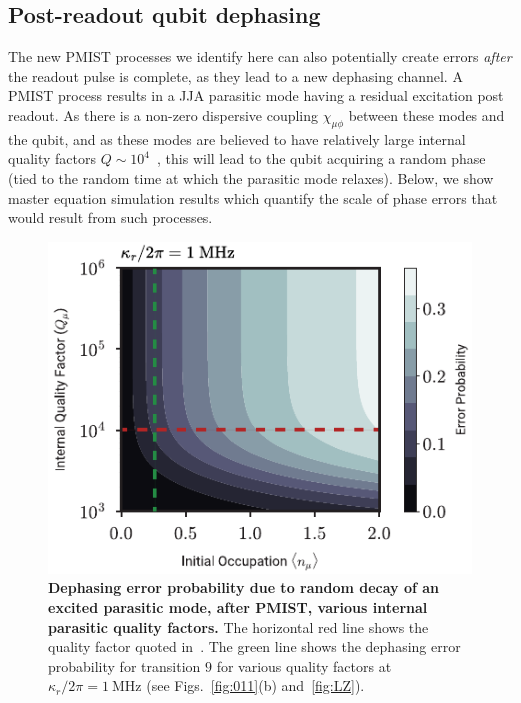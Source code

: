 \documentclass[%
reprint,
superscriptaddress,
 amsmath,amssymb,
 aps,
 prx,
longbibliography,
floatfix,
]{revtex4-2}
\begin{document}
\subsection{Post-readout qubit dephasing}\label{sec:dephasing}

The new PMIST processes we identify here can also potentially create errors \textit{after} the readout pulse is complete, as they lead to a new dephasing channel.  A PMIST process results in a JJA parasitic mode having a residual excitation post readout.  As there is a non-zero dispersive coupling 
$\chi_{\mu \phi}$ between these modes and the qubit, and as these modes are believed to have relatively large internal quality factors $Q\sim 10^{4}$~\cite{masluk_microwave_2012, masluk2013reducing}, this will lead to the qubit acquiring a random phase (tied to the random time at which the parasitic mode relaxes).  Below, we show master equation simulation results which quantify the
scale of phase errors that would result from such processes. 

\begin{figure}[htb]
    \centering
    \includegraphics[width=\linewidth]{Figures/dephasing.pdf}
    \caption{{\bf Dephasing error probability due to random decay of an excited parasitic mode, after PMIST, various internal parasitic quality factors.} The horizontal red line shows the quality factor quoted in~\cite{masluk_microwave_2012}. The green line shows the dephasing error probability for transition $9$ for various quality factors at $\kappa_r/2\pi=1 \ \mathrm{MHz}$ (see Figs.~\ref{fig:011}(b) and~\ref{fig:LZ}).}
    \label{fig:dephasing}
\end{figure}
\end{document}
